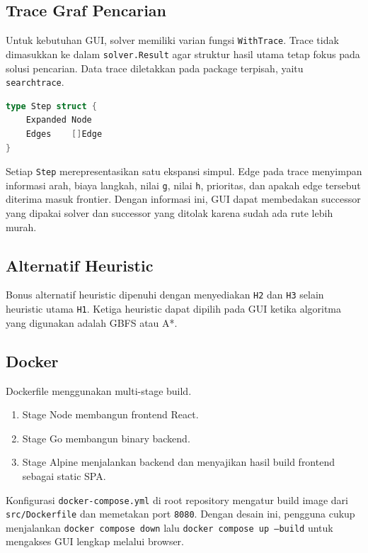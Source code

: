 \subsection{Trace Graf Pencarian}\label{sub:Trace Graf Pencarian}

Untuk kebutuhan GUI, solver memiliki varian fungsi \texttt{WithTrace}.
Trace tidak dimasukkan ke dalam \texttt{solver.Result} agar struktur
hasil utama tetap fokus pada solusi pencarian. Data trace diletakkan
pada package terpisah, yaitu \texttt{searchtrace}.

\begin{lstlisting}[language=Go, basicstyle=\ttfamily\small, breaklines=true]
type Step struct {
    Expanded Node
    Edges    []Edge
}
\end{lstlisting}

Setiap \texttt{Step} merepresentasikan satu ekspansi simpul. Edge pada
trace menyimpan informasi arah, biaya langkah, nilai \texttt{g},
nilai \texttt{h}, prioritas, dan apakah edge tersebut diterima masuk
frontier. Dengan informasi ini, GUI dapat membedakan successor yang
dipakai solver dan successor yang ditolak karena sudah ada rute lebih
murah.

\subsection{Alternatif Heuristic}\label{sub:Alternatif Heuristic}

Bonus alternatif heuristic dipenuhi dengan menyediakan \texttt{H2} dan
\texttt{H3} selain heuristic utama \texttt{H1}. Ketiga heuristic dapat
dipilih pada GUI ketika algoritma yang digunakan adalah GBFS atau A*.

\subsection{Docker}\label{sub:Docker}

Dockerfile menggunakan multi-stage build.
\begin{enumerate}
    \item Stage Node membangun frontend React.
    \item Stage Go membangun binary backend.
    \item Stage Alpine menjalankan backend dan menyajikan hasil build
        frontend sebagai static SPA.
\end{enumerate}

Konfigurasi \texttt{docker-compose.yml} di root repository mengatur
build image dari \texttt{src/Dockerfile} dan memetakan port
\texttt{8080}. Dengan desain ini, pengguna cukup menjalankan
\texttt{docker compose down} lalu \texttt{docker compose up --build}
untuk mengakses GUI lengkap melalui browser.
